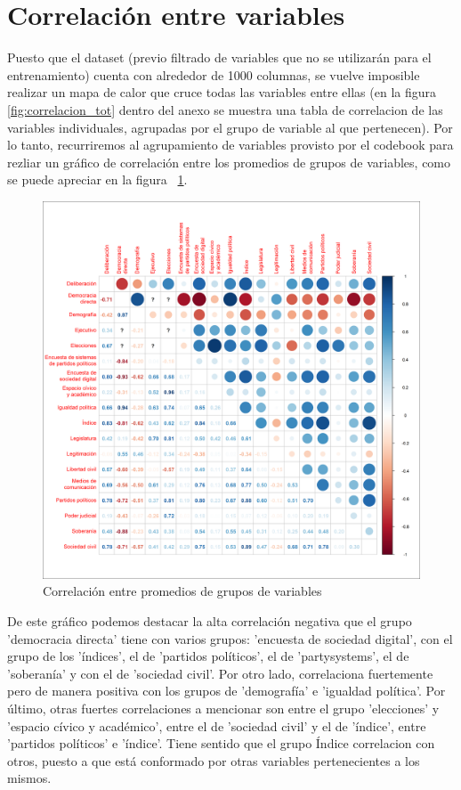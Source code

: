 \documentclass{article}
\begin{document}
\section{Correlación entre variables}

Puesto que el dataset (previo filtrado de variables que no se utilizarán para
el entrenamiento) cuenta con alrededor de 1000 columnas, se vuelve imposible
realizar un mapa de calor que cruce todas las variables entre ellas (en la figura 
\ref{fig:correlacion_tot} dentro del anexo se muestra una tabla de correlacion de las 
variables individuales, agrupadas por el grupo de variable al que pertenecen). Por lo 
tanto, recurriremos al agrupamiento de variables provisto por el codebook para rezliar un
gráfico de correlación entre los promedios de grupos de variables, como se puede 
apreciar en la figura ~\ref{fig:correlacion_gp}.
\begin{figure}[H]
  \centering  
  \includegraphics[width=1\textwidth]{5_correlacion_grupos.png}
  \caption{Correlación entre promedios de grupos de variables\label{fig:correlacion_gp}}
\end{figure}

De este gráfico podemos destacar la alta correlación negativa que el grupo
'democracia directa' tiene con varios grupos: 'encuesta de sociedad digital', con el 
grupo de los 'índices', el de 'partidos políticos', el de 'partysystems', el de 
'soberanía' y con el de 'sociedad civil'. Por otro lado, correlaciona fuertemente 
pero de manera positiva con los grupos de 'demografía' e 'igualdad política'. Por último, 
otras fuertes correlaciones a mencionar son entre el grupo 'elecciones' y 'espacio cívico 
y académico', entre el de 'sociedad civil' y el de 'índice', entre 'partidos políticos' e
'índice'. Tiene sentido que el grupo Índice correlacion con otros, puesto a que está
conformado por otras variables pertenecientes a los mismos.
\end{document}
